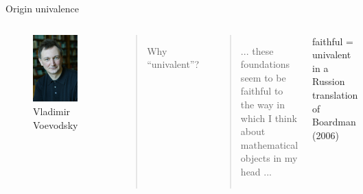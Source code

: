 \documentclass[english]{beamer}
\begin{document}
\begin{frame}{Origin univalence}

\begin{columns}[c]
        \begin{center}
            \begin{figure}[h!]
                \includegraphics[height=.7\textheight]{figures/voevodsky.jpg}
                \caption{Vladimir Voevodsky}
            \end{figure} 
        \end{center}
        \begin{quotation}
            Why ``univalent''?
        \end{quotation}

        \pause

        \begin{quotation}
        ... these foundations seem to be faithful to the way in which I think about mathematical objects in my head ...
        \end{quotation}

        faithful = univalent in a Russion translation of Boardman (2006)

\end{columns}




\end{frame}
\end{document}
